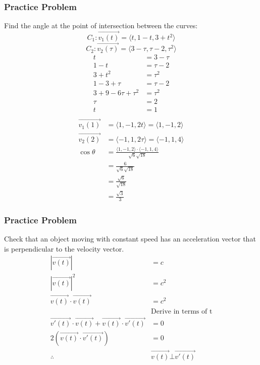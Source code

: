 \documentclass[letterpaper, 12pt]{math}
\begin{document}
\subsubsection*{Practice Problem}
Find the angle at the point of intersection between the curves:
\[ C_1: \overrightarrow{v_1(t)} = \langle t,1-t,3+t^2\rangle \]
\[ C_2: \overrightarrow{v_2(\tau)} = \langle3-\tau,\tau-2,\tau^2\rangle \]
\begin{align*}
  t &= 3-\tau \\
  1-t &= \tau-2 \\
  3+t^2 &= \tau^2 \\
  1-3+\tau &= \tau-2 \\
  3+9-6\tau+\tau^2 &= \tau^2 \\
  \tau &= 2 \\
  t &= 1 \\
\end{align*}
\begin{align*}
  \overrightarrow{v_1(1)} &= \langle1,-1,2t\rangle = \langle1,-1,2\rangle \\
  \overrightarrow{v_2(2)} &= \langle-1,1,2\tau\rangle = \langle-1,1,4\rangle \\
  \cos\theta &= \frac{\langle1,-1,2\rangle\cdot\langle-1,1,4\rangle}
    {\sqrt{6}\sqrt{18}} \\
  &= \frac{6}{\sqrt{6}\sqrt{18}} \\
  &= \frac{\sqrt{6}}{\sqrt{18}} \\
  &= \frac{\sqrt{3}}{3}
\end{align*}

\subsubsection*{Practice Problem}
Check that an object moving with constant speed has an acceleration vector that
is perpendicular to the velocity vector.
\begin{align*}
  |\overrightarrow{v(t)}| &= c \\
  |\overrightarrow{v(t)}|^2 &= c^2 \\
  \overrightarrow{v(t)}\cdot\overrightarrow{v(t)} &= c^2 \\
  &\text{Derive in terms of t} \\
  \overrightarrow{v'(t)}\cdot\overrightarrow{v(t)}+
    \overrightarrow{v(t)}\cdot\overrightarrow{v'(t)} &= 0 \\
  2\left(\overrightarrow{v(t)}\cdot\overrightarrow{v'(t)}\right) &= 0 \\
  \therefore~& \overrightarrow{v(t)}\bot\overrightarrow{v'(t)}
\end{align*}
\end{document}
